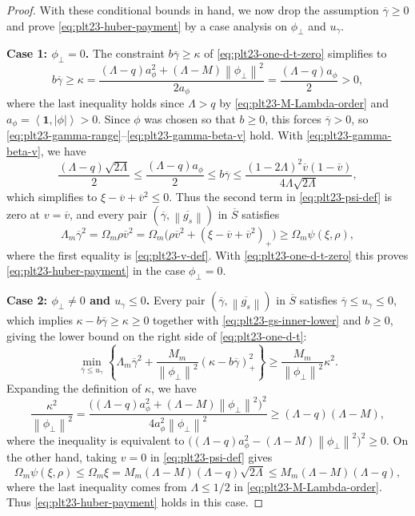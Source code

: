\documentclass[11pt]{article}
\numberwithin{equation}{section}
\newcommand{\one}{\mathbf 1}
\newcommand{\ip}[2]{\left\langle #1,#2\right\rangle}
\newcommand{\norm}[1]{\left\lVert #1\right\rVert}
\newcommand{\pos}[1]{\left(#1\right)_{+}}
\begin{document}
\begin{proof}
  With these conditional bounds in hand, we now drop the assumption $\overline\gamma\ge0$ and prove \eqref{eq:plt23-huber-payment} by a case analysis on $\phi_\perp$ and $u_\gamma$.

  \textbf{Case 1: $\phi_\perp=0$.}
  The constraint $b\overline\gamma\ge\kappa$ of \eqref{eq:plt23-one-d-t-zero} simplifies to
  \[
    b\overline\gamma\ge\kappa
    =\frac{(\Lambda-q)a_\phi^2+(\Lambda-M)\norm{\phi_\perp}^2}{2a_\phi}
    =\frac{(\Lambda-q)a_\phi}{2}>0,
  \]
  where the last inequality holds since $\Lambda>q$ by \eqref{eq:plt23-M-Lambda-order} and $a_\phi=\ip\one{|\phi|}>0$.
  Since $\phi$ was chosen so that $b\ge0$, this forces $\overline\gamma>0$, so \eqref{eq:plt23-gamma-range}--\eqref{eq:plt23-gamma-beta-v} hold.
  With \eqref{eq:plt23-gamma-beta-v}, we have
  \[
    \frac{(\Lambda-q)\sqrt{2\Lambda}}{2}
    \le\frac{(\Lambda-q)a_\phi}{2}
    \le b\overline\gamma
    \le\frac{(1-2\Lambda)^2\overline v(1-\overline v)}{4\Lambda\sqrt{2\Lambda}},
  \]
  which simplifies to $\xi-\overline v+\overline v^2\le0$.
  Thus the second term in \eqref{eq:plt23-psi-def} is zero at $v=\overline v$, and every pair $(\overline\gamma,\overline{\norm{g_s}})$ in $\overline S$ satisfies
  \[
    \Lambda_m\overline\gamma^2
    =\Omega_m\rho\overline v^2
    =\Omega_m\bigl(\rho\overline v^2+\pos{\xi-\overline v+\overline v^2}\bigr)
    \ge \Omega_m\psi(\xi,\rho),
  \]
  where the first equality is \eqref{eq:plt23-v-def}.
  With \eqref{eq:plt23-one-d-t-zero} this proves \eqref{eq:plt23-huber-payment} in the case $\phi_\perp=0$.

  \textbf{Case 2: $\phi_\perp\ne0$ and $u_\gamma\le0$.}
  Every pair $(\overline\gamma,\overline{\norm{g_s}})$ in $\overline S$ satisfies $\overline\gamma\le u_\gamma\le0$, which implies $\kappa-b\overline\gamma\ge\kappa\ge0$ together with \eqref{eq:plt23-gs-inner-lower} and $b\ge0$, giving the lower bound on the right side of \eqref{eq:plt23-one-d-t}:
  \[
    \min_{\overline\gamma\le u_\gamma}
    \left\{
    \Lambda_m\overline\gamma^2
    +\frac{M_m}{\norm{\phi_\perp}^2}\pos{\kappa-b\overline\gamma}^2
    \right\}
    \ge\frac{M_m}{\norm{\phi_\perp}^2}\kappa^2.
  \]
  Expanding the definition of $\kappa$, we have
  \[
    \frac{\kappa^2}{\norm{\phi_\perp}^2}
    =\frac{\bigl((\Lambda-q)a_\phi^2+(\Lambda-M)\norm{\phi_\perp}^2\bigr)^2}
    {4a_\phi^2\norm{\phi_\perp}^2}\ge(\Lambda-q)(\Lambda-M),
  \]
  where the inequality is equivalent to $\bigl((\Lambda-q)a_\phi^2-(\Lambda-M)\norm{\phi_\perp}^2\bigr)^2\ge0$.
  On the other hand, taking $v=0$ in \eqref{eq:plt23-psi-def} gives
  \[
    \Omega_m\psi(\xi,\rho)
    \le \Omega_m\xi=M_m(\Lambda-M)(\Lambda-q)\sqrt{2\Lambda}
    \le M_m(\Lambda-M)(\Lambda-q),
  \]
  where the last inequality comes from $\Lambda\le1/2$ in \eqref{eq:plt23-M-Lambda-order}.
  Thus \eqref{eq:plt23-huber-payment} holds in this case.


\end{proof}
\end{document}
